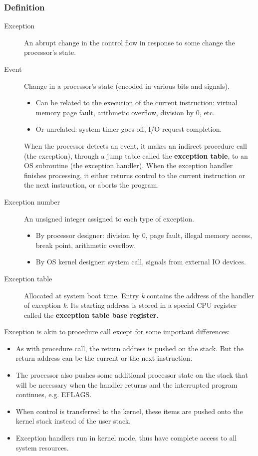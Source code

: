\subsubsection{Definition}
\begin{description}
\item[Exception]An abrupt change in the control flow in response to some change the processor's state. 
\item[Event]Change in a processor's state (encoded in various bits and signals). 
\begin{itemize}
\item Can be related to the execution of the current instruction: virtual memory page fault, arithmetic overflow, division by 0, etc.
\item Or unrelated: system timer goes off, I/O request completion.
\end{itemize}
When the processor detects an event, it makes an indirect procedure call (the exception), through a jump table called the \textbf{exception table}, to an OS subroutine (the exception handler). When the exception handler finishes processing, it either returns control to the current instruction or the next instruction, or aborts the program.
\item[Exception number]An unsigned integer assigned to each type of exception. 
\begin{itemize}
	\item By processor designer: division by 0, page fault, illegal memory access, break point, arithmetic overflow.
	\item By OS kernel designer: system call, signals from external IO devices.
\end{itemize}
\item[Exception table]Allocated at system boot time. Entry \emph{k} contains the address of the handler of exception \emph{k}. Its starting address is stored in a special CPU register called the \textbf{exception table base register}.
\end{description}
Exception is akin to procedure call except for some important differences:
\begin{itemize}
\item As with procedure call, the return address is pushed on the stack. But the return address can be the current or the next instruction.
\item The processor also pushes some additional processor state on the stack that will be necessary when the handler returns and the interrupted program continues, e.g. EFLAGS.
\item When control is transferred to the kernel, these items are pushed onto the kernel stack instead of the user stack.
\item Exception handlers run in kernel mode, thus have complete access to all system resources.
\end{itemize}
